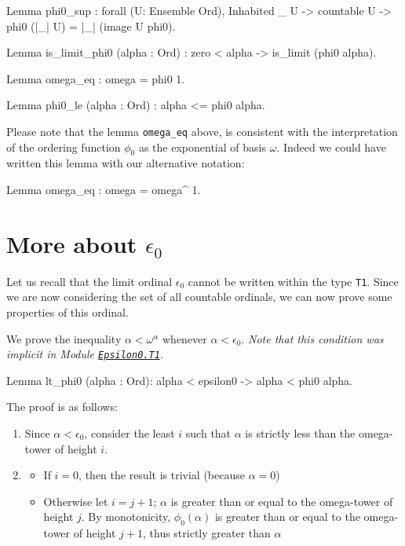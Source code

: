 {\begin{Coqsrc}
Lemma phi0_sup : forall (U: Ensemble Ord),
   Inhabited _ U ->   countable U ->  phi0 (|_| U) = |_| (image U phi0).

Lemma is_limit_phi0 (alpha : Ord) :
  zero < alpha ->  is_limit (phi0 alpha).

Lemma omega_eq : omega = phi0 1. 

Lemma phi0_le (alpha : Ord) : alpha <= phi0 alpha.
\end{Coqsrc}

Please note that the lemma \texttt{omega\_eq} above, is consistent with the interpretation of the ordering function $\phi_0$ as the exponential of basis $\omega$. Indeed we could have written this lemma with our alternative notation:

\begin{Coqsrc}
 Lemma omega_eq : omega = omega^ 1.
\end{Coqsrc}

\section{More about \texorpdfstring{$\epsilon_0$}{\texttt{epsilon0}}}

Let us recall that the limit ordinal  $\epsilon_0$ cannot be written within the type \texttt{T1}. Since we are now considering the set of all countable ordinals, we can now prove some properties of this ordinal.


We prove the inequality  $\alpha<\omega^\alpha$ whenever $\alpha < \epsilon_0$.
\emph{Note that this condition was implicit in Module \href{../theories/html/hydras.Epsilon0/T1.html\#lt_phi0}%
{\texttt{Epsilon0.T1}}.}

\begin{Coqsrc}
Lemma lt_phi0 (alpha : Ord):
  alpha < epsilon0 -> alpha < phi0 alpha.
\end{Coqsrc}

The proof is as follows:
\begin{enumerate}
\item Since $\alpha<\epsilon_0$, consider the least $i$ such that $\alpha$ is strictly less than the omega-tower of height $i$.
\item
  \begin{itemize}
  \item If $i=0$, then the result is trivial (because $\alpha=0$)
 \item  Otherwise let $i=j+1$; 
          $\alpha$ is greater than or equal to the omega-tower of height $j$.
         By monotonicity,  $\phi_0(\alpha)$ is greater than or equal to 
        the omega-tower of height $j+1$, thus strictly greater than $\alpha$
  \end{itemize}
 \end{enumerate}

}
